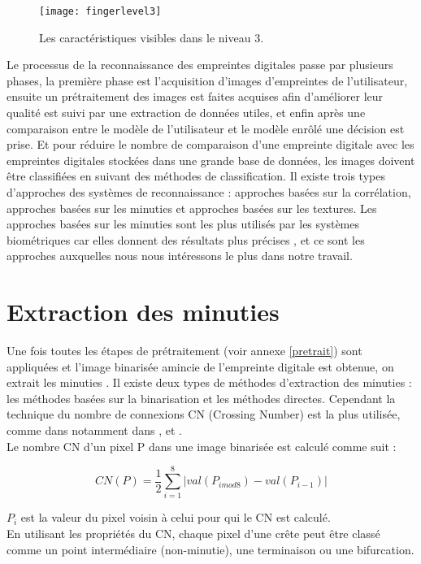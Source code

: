 \begin{enumerate}
	\begin{center}
		\begin{figure}[H]
			\centering
			\texttt{[image: fingerlevel3]}
			\caption{Les caractéristiques visibles dans le niveau 3.}
			\label{fig:chapitre2fingerprintlevel3}
		\end{figure}
	\end{center}
\end{enumerate}

Le processus de la reconnaissance des empreintes digitales passe par plusieurs phases, la première phase est l’acquisition d’images d’empreintes de l’utilisateur, ensuite un prétraitement des images est faites acquises afin d’améliorer leur qualité est suivi par une extraction de données utiles, et enfin après une comparaison entre le modèle de l’utilisateur et le modèle enrôlé une décision est prise. Et pour réduire le nombre de comparaison d'une empreinte digitale avec les empreintes digitales stockées dans une grande base de données, les images doivent être classifiées en suivant des méthodes de classification.
Il existe trois types d'approches des systèmes de reconnaissance : approches basées sur la corrélation, approches basées sur les minuties et approches basées sur les textures. 
Les approches basées sur les minuties sont les plus utilisés par les systèmes biométriques \citep{jiang2000fingerprint}car elles donnent des résultats plus précises \citep{o1998overview}, et ce sont les approches auxquelles nous nous intéressons le plus dans notre travail. 

\section{Extraction des minuties}
Une fois toutes les étapes de prétraitement (voir annexe \ref{pretrait}) sont appliquées et l’image binarisée amincie de l’empreinte digitale est obtenue, on extrait les minuties \citep{tisse2001systeme}. Il existe deux types de méthodes d'extraction des minuties : les méthodes basées sur la binarisation et les méthodes directes. Cependant la technique du nombre de connexions CN (Crossing Number) est la plus utilisée, comme dans \citep{Thai2003} notamment dans \citep{amengual1997real} , \citep{mehtre1993fingerprint} et \citep{kasaei1997fingerprint}.
\\
Le nombre CN d’un pixel P dans une image binarisée est calculé comme suit \citep{maltoni2009handbook} :
\begin{center}
	\begin{equation}\label{eq:cn}
	CN (P) = \frac{1}{2}\sum_{i=1}^{8}|val (P_{i mod 8 } )-  val(P_{i-1}) |
	\end{equation}
\end{center}
$ P_{i} $ est la valeur du pixel voisin à celui pour qui le CN est calculé.
\\En utilisant les propriétés du CN, chaque pixel d'une crête peut être classé comme un point intermédiaire (non-minutie), une terminaison ou une bifurcation.

